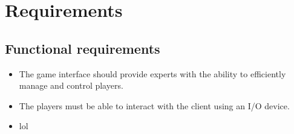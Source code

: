 \section{Requirements}
\subsection{Functional requirements}
\begin{itemize}
	\item The game interface should provide experts with the ability to efficiently manage and control players.
	\item The players must be able to interact with the client using an I/O device.
	\item lol
\end{itemize}
